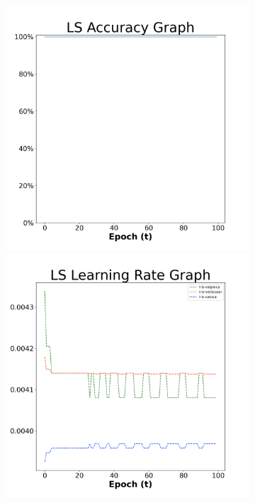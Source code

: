 \begin{figure}[H]
    \centering %
\begin{subfigure}{0.3\textwidth}
  \includegraphics[width=\linewidth]{images/exper1/iris/LS_0.01_acc.png}
    \includegraphics[width=\linewidth]{images/exper1/iris/LS_0.01_lr.png}

\end{subfigure}
\end{figure}
